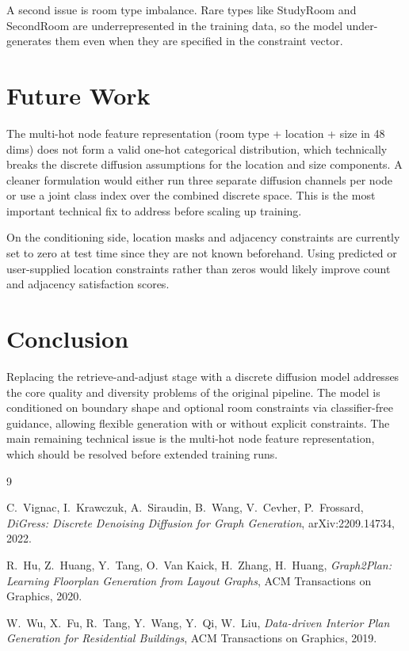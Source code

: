 \documentclass[11pt]{article}
\begin{document}
A second issue is room type imbalance. Rare types like StudyRoom and SecondRoom are underrepresented in the training data, so the model under-generates them even when they are specified in the constraint vector.

\section{Future Work}

The multi-hot node feature representation (room type + location + size in 48 dims) does not form a valid one-hot categorical distribution, which technically breaks the discrete diffusion assumptions for the location and size components. A cleaner formulation would either run three separate diffusion channels per node or use a joint class index over the combined discrete space. This is the most important technical fix to address before scaling up training.

On the conditioning side, location masks and adjacency constraints are currently set to zero at test time since they are not known beforehand. Using predicted or user-supplied location constraints rather than zeros would likely improve count and adjacency satisfaction scores.

\section{Conclusion}

Replacing the retrieve-and-adjust stage with a discrete diffusion model addresses the core quality and diversity problems of the original pipeline. The model is conditioned on boundary shape and optional room constraints via classifier-free guidance, allowing flexible generation with or without explicit constraints. The main remaining technical issue is the multi-hot node feature representation, which should be resolved before extended training runs.

\begin{thebibliography}{9}

C.\ Vignac, I.\ Krawczuk, A.\ Siraudin, B.\ Wang, V.\ Cevher, P.\ Frossard,
\textit{DiGress: Discrete Denoising Diffusion for Graph Generation},
arXiv:2209.14734, 2022.

R.\ Hu, Z.\ Huang, Y.\ Tang, O.\ Van Kaick, H.\ Zhang, H.\ Huang,
\textit{Graph2Plan: Learning Floorplan Generation from Layout Graphs},
ACM Transactions on Graphics, 2020.

W.\ Wu, X.\ Fu, R.\ Tang, Y.\ Wang, Y.\ Qi, W.\ Liu,
\textit{Data-driven Interior Plan Generation for Residential Buildings},
ACM Transactions on Graphics, 2019.

\end{thebibliography}
\end{document}
